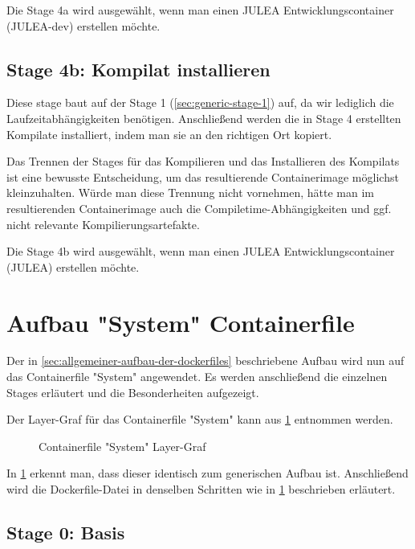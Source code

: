 Die Stage 4a wird ausgewählt, wenn man einen JULEA Entwicklungscontainer (JULEA-dev) erstellen möchte. 

\subsection{Stage 4b: Kompilat installieren} \label{sec:generic-stage-4b}

Diese stage baut auf der Stage 1 (\cref{sec:generic-stage-1}) auf, da wir lediglich die Laufzeitabhängigkeiten benötigen. Anschließend werden die in Stage 4 erstellten Kompilate installiert, indem man sie an den richtigen Ort kopiert. 

Das Trennen der Stages für das Kompilieren und das Installieren des Kompilats ist eine bewusste Entscheidung, um das resultierende Containerimage möglichst kleinzuhalten. Würde man diese Trennung nicht vornehmen, hätte man im resultierenden Containerimage auch die Compiletime-Abhängigkeiten und ggf. nicht relevante Kompilierungsartefakte. 

Die Stage 4b wird ausgewählt, wenn man einen JULEA Entwicklungscontainer (JULEA) erstellen möchte.

\section{Aufbau "System" Containerfile}

Der in \cref{sec:allgemeiner-aufbau-der-dockerfiles} beschriebene Aufbau wird nun auf das Containerfile "System" angewendet. Es werden anschließend die einzelnen Stages erläutert und die Besonderheiten aufgezeigt.

Der Layer-Graf für das Containerfile "System" kann aus \cref{fig:system-layer-graph} entnommen werden.
\begin{figure}[!htbp]
    \centering
    
    \caption{Containerfile "System" Layer-Graf}
    \label{fig:system-layer-graph}
\end{figure}
\FloatBarrier

In \cref{fig:system-layer-graph} erkennt man, dass dieser identisch zum generischen Aufbau ist. Anschließend wird die Dockerfile-Datei in denselben Schritten wie in \cref{fig:system-layer-graph} beschrieben erläutert.

\subsection{Stage 0: Basis} \label{sec:system-stage-0}

